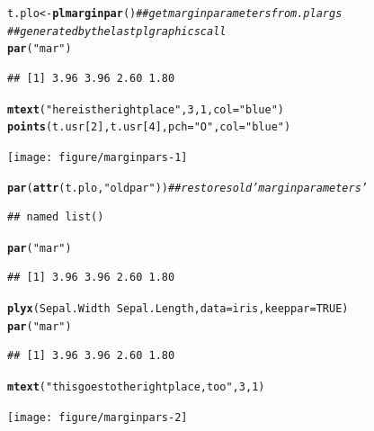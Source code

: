 \documentclass[11pt]{article}\usepackage[]{graphicx}\usepackage[]{color}
\makeatletter
\newcommand{\hlnum}[1]{\textcolor[rgb]{0.686,0.059,0.569}{#1}}%
\newcommand{\hlstr}[1]{\textcolor[rgb]{0.192,0.494,0.8}{#1}}%
\newcommand{\hlcom}[1]{\textcolor[rgb]{0.678,0.584,0.686}{\textit{#1}}}%
\newcommand{\hlopt}[1]{\textcolor[rgb]{0,0,0}{#1}}%
\newcommand{\hlstd}[1]{\textcolor[rgb]{0.345,0.345,0.345}{#1}}%
\newcommand{\hlkwb}[1]{\textcolor[rgb]{0.69,0.353,0.396}{#1}}%
\newcommand{\hlkwc}[1]{\textcolor[rgb]{0.333,0.667,0.333}{#1}}%
\newcommand{\hlkwd}[1]{\textcolor[rgb]{0.737,0.353,0.396}{\textbf{#1}}}%
\newenvironment{kframe}{%
 \def\at@end@of@kframe{}%
 \ifinner\ifhmode%
  \def\at@end@of@kframe{\end{minipage}}%
  \begin{minipage}{\columnwidth}%
 \fi\fi%
 \def\FrameCommand##1{\hskip\@totalleftmargin \hskip-\fboxsep
 \colorbox{shadecolor}{##1}\hskip-\fboxsep
     \hskip-\linewidth \hskip-\@totalleftmargin \hskip\columnwidth}%
 \MakeFramed {\advance\hsize-\width
   \@totalleftmargin\z@ \linewidth\hsize
   \@setminipage}}%
 {\par\unskip\endMakeFramed%
 \at@end@of@kframe}
\newenvironment{knitrout}{}{} %
\makeatother
\begin{document}
\begin{knitrout}
\begin{kframe}
\begin{alltt}
\hlstd{t.plo} \hlkwb{<-} \hlkwd{plmarginpar}\hlstd{()} \hlcom{## get margin parameters from .plargs }
  \hlcom{## generated by the last pl graphics call}
\hlkwd{par}\hlstd{(}\hlstr{"mar"}\hlstd{)}
\end{alltt}
\begin{verbatim}
## [1] 3.96 3.96 2.60 1.80
\end{verbatim}
\begin{alltt}
\hlkwd{mtext}\hlstd{(}\hlstr{"here is the right place"}\hlstd{,}\hlnum{3}\hlstd{,}\hlnum{1}\hlstd{,} \hlkwc{col}\hlstd{=}\hlstr{"blue"}\hlstd{)}
\hlkwd{points}\hlstd{(t.usr[}\hlnum{2}\hlstd{],t.usr[}\hlnum{4}\hlstd{],} \hlkwc{pch}\hlstd{=}\hlstr{"O"}\hlstd{,} \hlkwc{col}\hlstd{=}\hlstr{"blue"}\hlstd{)}
\end{alltt}
\end{kframe}
\texttt{[image: figure/marginpars-1]} 
\begin{kframe}\begin{alltt}
\hlkwd{par}\hlstd{(}\hlkwd{attr}\hlstd{(t.plo,} \hlstr{"oldpar"}\hlstd{))}  \hlcom{## restores old 'margin parameters' }
\end{alltt}
\begin{verbatim}
## named list()
\end{verbatim}
\begin{alltt}
\hlkwd{par}\hlstd{(}\hlstr{"mar"}\hlstd{)}
\end{alltt}
\begin{verbatim}
## [1] 3.96 3.96 2.60 1.80
\end{verbatim}
\begin{alltt}
\hlkwd{plyx}\hlstd{(Sepal.Width}\hlopt{~}\hlstd{Sepal.Length,} \hlkwc{data}\hlstd{=iris,} \hlkwc{keeppar}\hlstd{=}\hlnum{TRUE}\hlstd{)}
\hlkwd{par}\hlstd{(}\hlstr{"mar"}\hlstd{)}
\end{alltt}
\begin{verbatim}
## [1] 3.96 3.96 2.60 1.80
\end{verbatim}
\begin{alltt}
\hlkwd{mtext}\hlstd{(}\hlstr{"this goes to the right place, too"}\hlstd{,}\hlnum{3}\hlstd{,}\hlnum{1}\hlstd{)}
\end{alltt}
\end{kframe}
\texttt{[image: figure/marginpars-2]} 

\end{knitrout}
\end{document}
